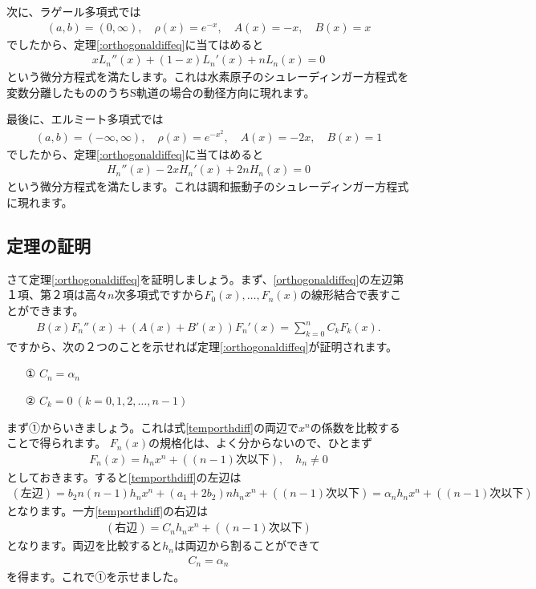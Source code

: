 \documentclass[report,paper=a4, fontsize=12pt, line_length=16cm, number_of_lines=33,dvipdfmx]{jlreq}
\numberwithin{equation}{section}
\begin{document}
次に、ラゲール多項式では
\begin{align}
  (a,b)=(0,\infty),\quad \rho(x)=e^{-x},\quad A(x)=-x,\quad B(x)=x
\end{align}
でしたから、定理\ref{:orthogonaldiffeq}に当てはめると
\begin{align}
  xL_n''(x)+(1-x) L_n'(x)+nL_n(x)=0
\end{align}
という微分方程式を満たします。これは水素原子のシュレーディンガー方程式を変数分離したもののうちS軌道の場合の動径方向に現れます。

最後に、エルミート多項式では
\begin{align}
  (a,b)=(-\infty,\infty),\quad \rho(x)=e^{-x^2},\quad A(x)=-2x,\quad B(x)=1
\end{align}
でしたから、定理\ref{:orthogonaldiffeq}に当てはめると
\begin{align}
  H_n''(x)-2x H_n'(x)+2n H_n(x)=0
\end{align}
という微分方程式を満たします。これは調和振動子のシュレーディンガー方程式に現れます。

\subsection{定理の証明}
さて定理\ref{:orthogonaldiffeq}を証明しましょう。まず、\eqref{orthogonaldiffeq}の左辺第１項、第２項は高々$n$次多項式ですから$F_0(x),\dots,F_n(x)$の線形結合で表すことができます。
\begin{align}
  B(x)F_n''(x)+(A(x)+B'(x))F_n'(x)=\sum_{k=0}^{n}C_k F_k(x).\label{temporthdiff}
\end{align}
ですから、次の２つのことを示せれば定理\ref{:orthogonaldiffeq}が証明されます。
\begin{itemize}
  \item[① ] $C_n=\alpha_n$
  \item[② ] $C_k=0\ (k=0,1,2,\dots,n-1)$ 
\end{itemize}

まず①からいきましょう。これは式\eqref{temporthdiff}の両辺で$x^n$の係数を比較することで得られます。
$F_n(x)$の規格化は、よく分からないので、ひとまず
\begin{align}
  F_n(x)=h_n x^n +((n-1)\text{次以下}),\quad h_n\ne 0
\end{align}
としておきます。すると\eqref{temporthdiff}の左辺は
\begin{align}
  (\text{左辺})=b_2 n(n-1)h_n x^n+(a_1+2b_2)n h_n x^n+((n-1)\text{次以下})=\alpha_n h_n x^n+((n-1)\text{次以下})
\end{align}
となります。一方\eqref{temporthdiff}の右辺は
\begin{align}
  (\text{右辺})=C_nh_nx^n+((n-1)\text{次以下})
\end{align}
となります。両辺を比較すると$h_n$は両辺から割ることができて
\begin{align}
  C_n=\alpha_n
\end{align}
を得ます。これで①を示せました。
\end{document}
